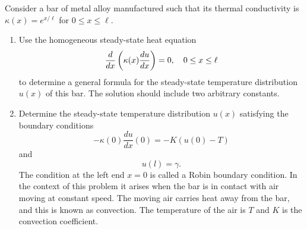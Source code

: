 Consider a bar of metal alloy manufactured such that its thermal conductivity
is $\kappa(x) = e^{x/\ell}$ for  $0\le x\le \ell$.
\begin{enumerate}
\item  Use the homogeneous steady-state heat equation
\[
{d \over d x} \left(\kappa(x) {d u \over d x}\right)=0,\quad 0\le x\le \ell
\]
to determine a general formula for the steady-state temperature distribution $u(x)$ of this bar. The solution should include two arbitrary constants. 

\item Determine the steady-state temperature distribution $u(x)$ satisfying the boundary conditions
\[
-\kappa\left(0\right) \frac{d u}{d x}\left(0\right) = -K\left(u\left(0\right)-T\right)
\]
and
\[
u(l) = \gamma.
\]
The condition at the left end $x=0$ is called a Robin boundary condition. In the context of this problem it arises when the bar is in contact with air moving at constant speed.  The moving air carries heat away from the bar, and this is known as convection. The temperature of the air is $T$ and $K$ is the convection coefficient.
\end{enumerate}

